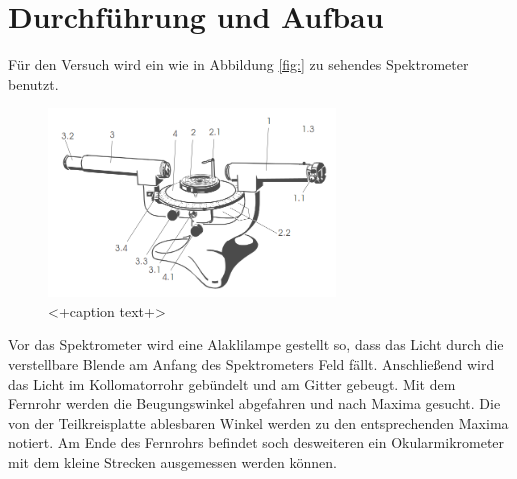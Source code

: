 \section{Durchführung und Aufbau}
\label{sec:Durchführung}
Für den Versuch wird ein wie in Abbildung \ref{fig:} zu sehendes Spektrometer benutzt. 
\begin{figure}
  \centering
  \includegraphics[height=5cm]{picture/Aufbau.png}
  \caption{<+caption text+>}
  \label{fig:<+label+>}
\end{figure}
Vor das Spektrometer wird eine Alaklilampe gestellt so, dass das Licht durch die verstellbare Blende am Anfang des Spektrometers Feld fällt. Anschließend wird das Licht im Kollomatorrohr gebündelt und am Gitter gebeugt. Mit dem Fernrohr werden die Beugungswinkel abgefahren und nach Maxima gesucht. Die von der Teilkreisplatte ablesbaren Winkel werden zu den entsprechenden Maxima notiert. Am Ende des Fernrohrs befindet soch desweiteren ein Okularmikrometer mit dem kleine Strecken ausgemessen werden können. 

